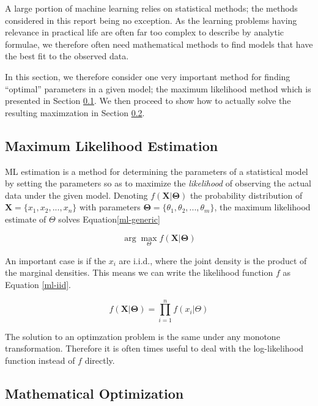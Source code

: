 \documentclass[11pt, oneside, a4paper]{report}
\begin{document}
A large portion of machine learning relies on statistical
methods; the methods considered in this report being no exception. As the learning problems having relevance in practical life are often
far too complex to describe by analytic formulae, we therefore often
need mathematical methods to find models that have the best fit to the
observed data. 

In this section, we therefore consider one very
important method for finding ``optimal'' parameters in a given model;
the maximum likelihood method which is presented in Section
\ref{ml-estimation}. We then proceed to show how to actually solve
the resulting maximzation in Section \ref{optimization}.


\subsection{Maximum Likelihood Estimation}\label{ml-estimation}

ML estimation is a method for determining the parameters of a
statistical model by setting the parameters so as to maximize the
\emph{likelihood} of observing the actual data under the given
model. Denoting $f(\boldsymbol{X}|\boldsymbol{\Theta})$ the
probability distribution of $\boldsymbol{X} = \{x_1,x_2,...,x_n\}$
with parameters $\boldsymbol{\Theta} = \{\theta_1, \theta_2, ...,
\theta_m\}$, the maximum likelihood estimate of $\Theta$ solves Equation\ref{ml-generic}

\begin{equation}
  \label{ml-generic}
  \arg \max_\Theta f(\boldsymbol{X}|\boldsymbol{\Theta})
\end{equation}

An important case is if the $x_i$ are i.i.d., where the joint density
is the product of the marginal densities. This means we can write the
likelihood function $f$ as Equation \ref{ml-iid}.

\begin{equation}  
  \label{ml-iid}
  f(\boldsymbol{X}|\boldsymbol{\Theta}) = \prod_{i = 1}^n f(x_i|\Theta)
\end{equation}

The solution to an optimzation problem is the same under any monotone transformation. Therefore it is often times useful to deal with the log-likelihood function instead of $f$ directly.


\subsection{Mathematical Optimization}\label{optimization}
\end{document}
